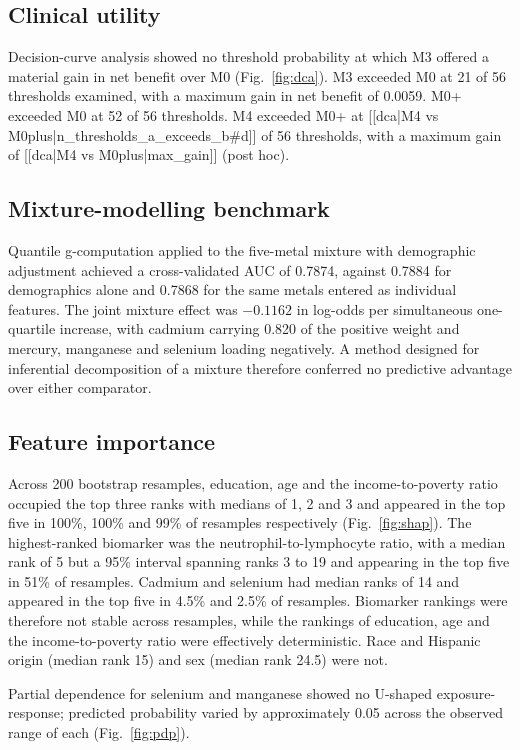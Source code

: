 \documentclass[12pt]{article}
\begin{document}
\subsection*{Clinical utility}

Decision-curve analysis showed no threshold probability at which M3 offered a material gain in net benefit over M0 (Fig.~\ref{fig:dca}). M3 exceeded M0 at 21 of 56 thresholds examined, with a maximum gain in net benefit of 0.0059. M0+ exceeded M0 at 52 of 56 thresholds. M4 exceeded M0+ at [[dca|M4 vs M0plus|n_thresholds_a_exceeds_b#d]] of 56 thresholds, with a maximum gain of [[dca|M4 vs M0plus|max_gain]] (post hoc).

\subsection*{Mixture-modelling benchmark}

Quantile g-computation applied to the five-metal mixture with demographic adjustment achieved a cross-validated AUC of 0.7874, against 0.7884 for demographics alone and 0.7868 for the same metals entered as individual features. The joint mixture effect was $-0.1162$ in log-odds per simultaneous one-quartile increase, with cadmium carrying 0.820 of the positive weight and mercury, manganese and selenium loading negatively. A method designed for inferential decomposition of a mixture therefore conferred no predictive advantage over either comparator.

\subsection*{Feature importance}

Across 200 bootstrap resamples, education, age and the income-to-poverty ratio occupied the top three ranks with medians of 1, 2 and 3 and appeared in the top five in 100\%, 100\% and 99\% of resamples respectively (Fig.~\ref{fig:shap}). The highest-ranked biomarker was the neutrophil-to-lymphocyte ratio, with a median rank of 5 but a 95\% interval spanning ranks 3 to 19 and appearing in the top five in 51\% of resamples. Cadmium and selenium had median ranks of 14 and appeared in the top five in 4.5\% and 2.5\% of resamples. Biomarker rankings were therefore not stable across resamples, while the rankings of education, age and the income-to-poverty ratio were effectively deterministic. Race and Hispanic origin (median rank 15) and sex (median rank 24.5) were not.

Partial dependence for selenium and manganese showed no U-shaped exposure-response; predicted probability varied by approximately 0.05 across the observed range of each (Fig.~\ref{fig:pdp}).
\end{document}
